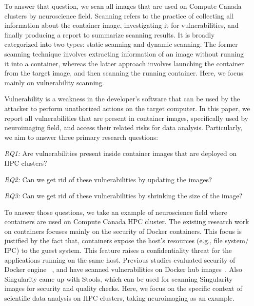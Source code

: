 \documentclass[a4paper,num-refs]{oup-contemporary}
\begin{document}
To answer that question, we scan all images that are used on Compute
Canada clusters by neuroscience field. Scanning refers to the practice of
collecting all information about the container image, investigating it
for vulnerabilities, and finally producing a
report to summarize scanning results. It is broadly categorized into
two types: static scanning and dynamic scanning. The former scanning technique
involves extracting information of an image without running it into a container,
whereas the latter approach involves launching the container from the target image, and
then scanning the running container.
Here, we focus mainly on vulnerability scanning.

Vulnerability is a weakness in the developer's software that can be used
by the attacker to perform unathorized actions on the target computer.
In this paper, we report all vulnerabilities that are present in
container images, specifically used by neuroimaging field, and access their
related risks for data analysis. Particularly, we aim to answer three primary
research questions:

\textit{RQ1:} Are vulnerabilities present inside container images that are
deployed on HPC clusters?

\textit{RQ2:} Can we get rid of these vulnerabilities by updating the
images?

\textit{RQ3:} Can we get rid of these vulnerabilities by shrinking the
size of the image?

To answer those questions, we take an example of neuroscience field where
containers are used on Compute Canada HPC cluster.
The existing research work on containers focuses mainly on the security of Docker
containers.
This focus is justified by the fact that, containers expose the host's resources
(e.g., file system/ IPC) to the guest system. This feature raises a confidentiality
threat for the applications running on the same host. Previous studies evaluated
security of Docker engine ~\cite{martin2018docker, sultan2019container, combe2016docker, bui2015analysis},
and have scanned vulnerabilities on Docker hub images~\cite{Shu2017, gummaraju2015over}.
Also Singularity came up with Stools, which can be used for scanning Singularity images
for security and quality checks.
Here, we focus on the specific context of scientific data analysis on HPC clusters, taking
neuroimaging as an example.
\end{document}
